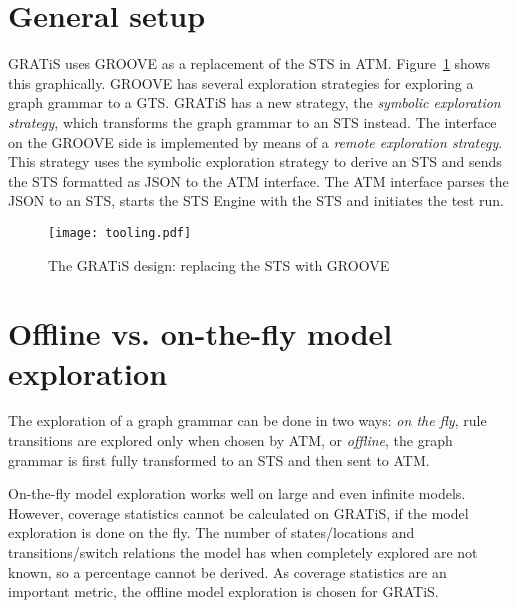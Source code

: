 \section{General setup}\label{sec:general-setup}
GRATiS uses GROOVE as a replacement of the STS in ATM. Figure~\ref{fig:tooling} shows this graphically. GROOVE has several exploration strategies for exploring a graph grammar to a GTS. GRATiS has a new strategy, the \textit{symbolic exploration strategy}, which transforms the graph grammar to an STS instead. The interface on the GROOVE side is implemented by means of a \textit{remote exploration strategy}. This strategy uses the symbolic exploration strategy to derive an STS and sends the STS formatted as JSON to the ATM interface. The ATM interface parses the JSON to an STS, starts the STS Engine with the STS and initiates the test run.

\begin{figure}[ht]
  \begin{center}
    \texttt{[image: tooling.pdf]}
  \end{center}
  \caption{The GRATiS design: replacing the STS with GROOVE}
  \label{fig:tooling}
\end{figure}

\section{Offline vs. on-the-fly model exploration}\label{sec:offline-on-the-fly}
The exploration of a graph grammar can be done in two ways: \textit{on the fly}, rule transitions are explored only when chosen by ATM, or \textit{offline}, the graph grammar is first fully transformed to an STS and then sent to ATM.

On-the-fly model exploration works well on large and even infinite models. However, coverage statistics cannot be calculated on GRATiS, if the model exploration is done on the fly. The number of states/locations and transitions/switch relations the model has when completely explored are not known, so a percentage cannot be derived. As coverage statistics are an important metric, the offline model exploration is chosen for GRATiS.


